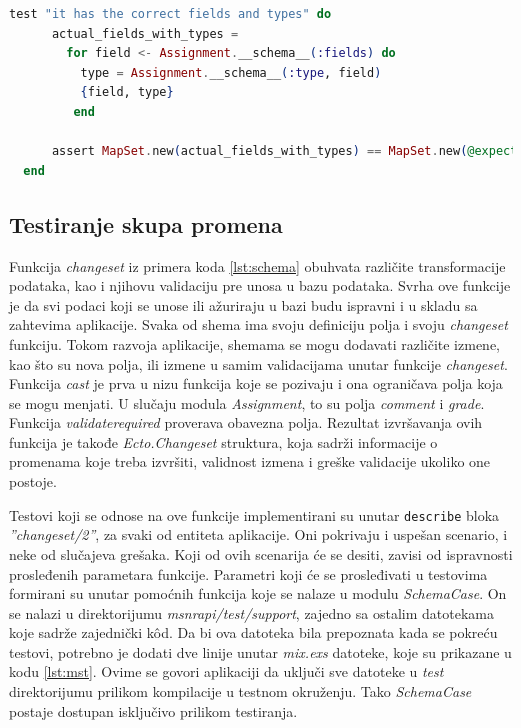 \documentclass[12pt,oneside]{memoir}
\begin{document}
\begin{minipage}{\linewidth}
\begin{lstlisting}[language=elixir, basicstyle=\small, caption={Test za proveru polja i tipova tabele \emph{assignments}},captionpos=b, label={lst:testschema}]
    test "it has the correct fields and types" do
      actual_fields_with_types =
        for field <- Assignment.__schema__(:fields) do
          type = Assignment.__schema__(:type, field)
          {field, type}
         end
    
      assert MapSet.new(actual_fields_with_types) == MapSet.new(@expected_fields_with_types)
  end
\end{lstlisting}
\end{minipage}

\subsection{Testiranje skupa promena}
\label{sec:change}
\par Funkcija \emph{changeset} iz primera koda \ref{lst:schema} obuhvata različite transformacije podataka, kao i njihovu validaciju pre unosa u bazu podataka. Svrha ove funkcije je da svi podaci koji se unose ili ažuriraju u bazi budu ispravni i u skladu sa zahtevima aplikacije. Svaka od shema ima svoju definiciju polja i svoju \emph{changeset} funkciju. Tokom razvoja aplikacije, shemama se mogu dodavati različite izmene, kao što su nova polja, ili izmene u samim validacijama unutar funkcije \emph{changeset}. Funkcija \emph{cast} je prva u nizu funkcija koje se pozivaju i ona ograničava polja koja se mogu menjati. U slučaju modula \emph{Assignment}, to su polja \emph{comment} i \emph{grade}. Funkcija \emph{validate{\textunderscore}required} proverava obavezna polja. Rezultat izvršavanja ovih funkcija je takođe \emph{Ecto.Changeset} struktura, koja sadrži informacije o promenama koje treba izvršiti, validnost izmena i greške validacije ukoliko one postoje.
\par Testovi koji se odnose na ove funkcije implementirani su unutar \texttt{describe} bloka \emph{''changeset/2''}, za svaki od entiteta aplikacije. Oni pokrivaju i uspešan scenario, i neke od slučajeva grešaka. Koji od ovih scenarija će se desiti, zavisi od ispravnosti prosleđenih parametara funkcije. Parametri koji će se prosleđivati u testovima formirani su unutar pomoćnih funkcija koje se nalaze u modulu \emph{SchemaCase}. On se nalazi u direktorijumu \emph{msnr{\textunderscore}api/test/support}, zajedno sa ostalim datotekama koje sadrže zajednički k\^{o}d. Da bi ova datoteka bila prepoznata kada se pokreću testovi, potrebno je dodati dve linije unutar \emph{mix.exs} datoteke, koje su prikazane u kodu \ref{lst:mst}. Ovime se govori aplikaciji da uključi sve datoteke u \emph{test} direktorijumu prilikom kompilacije u testnom okruženju. Tako \emph{SchemaCase} postaje dostupan isključivo prilikom testiranja. \\
\end{document}
